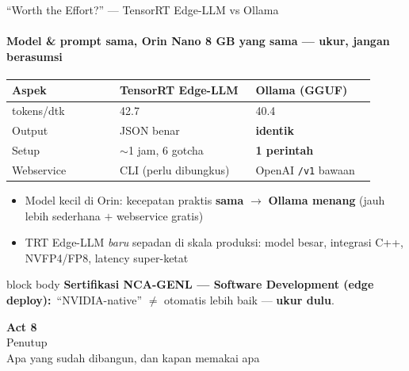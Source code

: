 \documentclass[aspectratio=169,t]{beamer}
\newcommand{\acttitle}[3]{%
  \begin{frame}[plain]
    \vspace{1.5cm}
    \begin{center}
      {\color{nvgreen}\Huge\bfseries Act #1}\\[1.2em]
      {\color{nvwhite}\Huge #2}\\[0.8em]
      {\color{nvgray}\Large #3}
    \end{center}
  \end{frame}%
}
\newcommand{\certnote}[2]{%
  \vspace{0.25em}
  \begin{beamercolorbox}[rounded=true,shadow=false,sep=5pt]{block body}
    {\scriptsize\color{nvblue}\textbf{Sertifikasi NCA-GENL --- #1:}}\,
    {\scriptsize\color{nvgray}#2}
  \end{beamercolorbox}%
}
\begin{document}
\begin{frame}{``Worth the Effort?'' --- TensorRT Edge-LLM vs Ollama}
  \framesubtitle{Model \& prompt sama, Orin Nano 8 GB yang sama --- ukur, jangan berasumsi}
  \begin{center}
  \renewcommand{\arraystretch}{1.25}{\footnotesize\setlength{\tabcolsep}{6pt}
  \begin{tabular}{@{}p{0.27\linewidth}p{0.34\linewidth}p{0.30\linewidth}@{}}
    \toprule \rowcolor{nvcard!50}
    \textbf{Aspek} & \textbf{TensorRT Edge-LLM} & \textbf{Ollama (GGUF)} \\ \midrule
    tokens/dtk & 42.7 & 40.4 \\
    Output & JSON benar & \textbf{identik} \\
    Setup & $\sim$1 jam, 6 gotcha & \textbf{1 perintah} \\
    Webservice & CLI (perlu dibungkus) & OpenAI \texttt{/v1} bawaan \\
    \bottomrule
  \end{tabular}}
  \end{center}
  \vspace{0.2em}
  \begin{itemize}\footnotesize
    \item[\textcolor{nvlightgreen}{$\Rightarrow$}] Model kecil di Orin: kecepatan praktis \textbf{sama} $\to$ \textbf{Ollama menang} (jauh lebih sederhana $+$ webservice gratis)
    \item[\textcolor{nvorange}{$\bullet$}] TRT Edge-LLM \emph{baru} sepadan di skala produksi: model besar, integrasi C++, NVFP4/FP8, latency super-ketat
  \end{itemize}
  \certnote{Software Development (edge deploy)}{``NVIDIA-native'' $\neq$ otomatis lebih baik --- \textbf{ukur dulu}.}
\end{frame}

\acttitle{8}{Penutup}{Apa yang sudah dibangun, dan kapan memakai apa}
\end{document}
